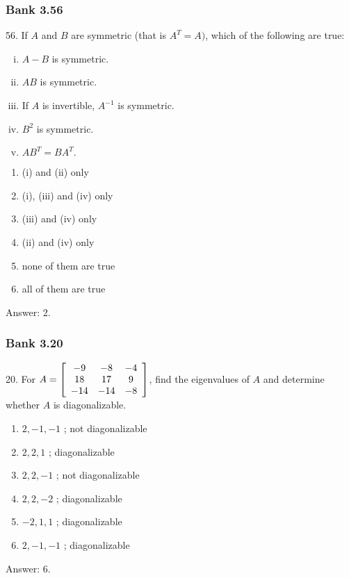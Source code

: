 \documentclass[pdf,9pt,t]{beamer}
\begin{document}
\begin{frame}[fragile]
    \frametitle{Bank 3.56}
    \begin{problem}
	56. If $A$ and $B$ are symmetric (that is $A^{T}=A)$, which of the following are true:
	\begin{enumerate}[(i)]
	    \item $A-B$ is symmetric.
	    \item $AB$ is symmetric.
	    \item If $A$ is invertible, $A^{-1}$ is symmetric.
	    \item $B^{2}$ is symmetric.
	    \item $AB^{T}=BA^{T}.$
	\end{enumerate}
	\begin{enumerate}
	    \item (i)  and (ii)  only
	    \item (i), (iii)  and (iv)  only
	    \item (iii)  and (iv)  only
	    \item (ii)  and (iv)  only
	    \item none of them are true
	    \item all of them are true
	\end{enumerate}
    \end{problem}
    \pause
    Answer: 2.
\end{frame}

\begin{frame}[fragile]
    \frametitle{Bank 3.20}
    \begin{problem}
	20. For $A=\left[
	    \begin{array}[c]{ccc}
		-9  &  -8  &  -4\\
		18  &  17  &  9\\
		-14 &  -14 &  -8
	    \end{array}
	    \right]$, find the eigenvalues of $A$ and determine whether $A$ is diagonalizable.
	\begin{enumerate}
	    \item $2,-1,-1$ ; not diagonalizable
	    \item $2,2,1$   ; diagonalizable
	    \item $2,2,-1$  ; not diagonalizable
	    \item $2,2,-2$  ; diagonalizable
	    \item $-2,1,1$  ; diagonalizable
	    \item $2,-1,-1$ ; diagonalizable
	\end{enumerate}
    \end{problem}
    \pause
    Answer: 6.

\end{frame}
\end{document}
